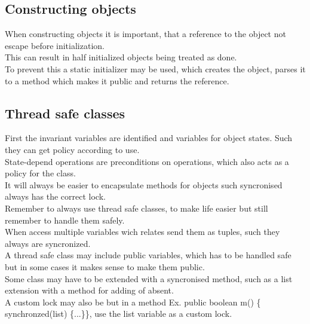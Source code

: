 \documentclass[12pt, a4paper]{article}
\begin{document}
		\subsection{Constructing objects}
			When constructing objects it is important, that a reference to the object not escape before initialization.\\
			This can result in half initialized objects being treated as done.\\
			To prevent this a static initializer may be used, which creates the object, parses it to a method which makes it public and returns the reference.
		\subsection{Thread safe classes}
			First the invariant variables are identified and variables for object states. Such they can get policy according to use.\\
			State-depend operations are preconditions on operations, which also acts as a policy for the class.\\
			It will always be easier to encapsulate methods for objects such syncronised always has the correct lock.\\
			Remember to always use thread safe classes, to make life easier but still remember to handle them safely.\\
			When access multiple variables wich relates send them as tuples, such they always are syncronized.\\
			A thread safe class may include public variables, which has to be handled safe but in some cases it makes sense to make them public.\\
			Some class may have to be extended with a syncronised method, such as a list extension with a method for adding of absent.\\
			A custom lock may also be but in a method Ex. public boolean m() \{ synchronzed(list) \{...\}\}, use the list variable as a custom lock.\\
			
\end{document}
